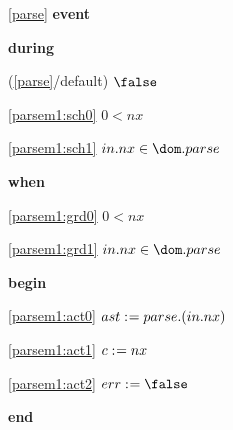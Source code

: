 \noindent \ref{parse}  \textbf{event}
\begin{block}
  \item   \textbf{during}
  \begin{block}
  \item[ (\ref{parse}/default) ]\sout{$\false$} %
  \end{block}
  \begin{block}
  \item[ \eqref{parsem1:sch0} ]{$0 < nx$} %
  \item[ \eqref{parsem1:sch1} ]{$in.nx \in \dom.parse$} %
  \end{block}
  \item   \textbf{when}
  \begin{block}
  \item[ \eqref{parsem1:grd0} ]{$0 < nx$} %
  \item[ \eqref{parsem1:grd1} ]{$in.nx \in \dom.parse$} %
  \end{block}
  \item   \textbf{begin}
  \begin{block}
  \item[ \eqref{parsem1:act0} ]{$ast \mathrel{:\mkern1mu=} parse.(in.nx) $} %
  \item[ \eqref{parsem1:act1} ]{$c \mathrel{:\mkern1mu=} nx$} %
  \item[ \eqref{parsem1:act2} ]{$err \bcmeq \false$} %
  \end{block}
  \item   \textbf{end} \\
\end{block}
